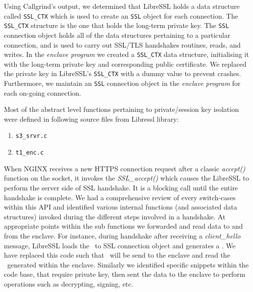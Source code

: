 \documentclass[../main.tex]{subfiles}
\begin{document}
Using Callgrind's output, we determined that LibreSSL holds a data
structure called \texttt{SSL\_CTX} which is used to create an
\texttt{SSL} object for each connection. The \texttt{SSL_CTX}
structure is the one that holds the long-term private key. The
\texttt{SSL} connection object holds all of the data structures
pertaining to a particular connection, and is used to carry out
SSL/TLS handshakes routines, reads, and writes. In the \textit{enclave
  program} we created a \texttt{SSL\_CTX} data structure, initialising
it with the long-term private key and corresponding public
certificate. We replaced the private key in LibreSSL's
\texttt{SSL_CTX} with a dummy value to prevent crashes. Furthermore,
we maintain an \texttt{SSL} connection object in the \textit{enclave
  program} for each on-going connection.
 
Most of the abstract level functions pertaining to private/session key
isolation were defined in following source files from Libressl
library:
\begin{enumerate}
  \item \texttt{s3\_srvr.c}
  \item \texttt{t1\_enc.c}
\end{enumerate}
 
When NGINX receives a new HTTPS connection request after a classic
\textit{accept()} function on the socket, it invokes the
\textit{SSL\_accept()} which causes the LibreSSL to perform the server
side of SSL handshake. It is a blocking call until the entire
handshake is complete. We had a comprehensive review of every
switch-cases within this API and identified various internal functions
(and associated data structures) invoked during the different steps
involved in a handshake. At appropriate points within the sub
functions we forwarded and read data to and from the enclave. For
instance, during handshake after receiving a \textit{client\_hello}
message, LibreSSL loads the \crandom~to SSL connection object and
generates a \srandom. We have replaced this code such that
\crandom~will be send to the enclave and read the \srandom~generated
within the enclave. Similarly we identified specific snippets within
the code base, that require private key, then sent the data to the
enclave to perform operations such as decrypting, signing, etc.
\end{document}
